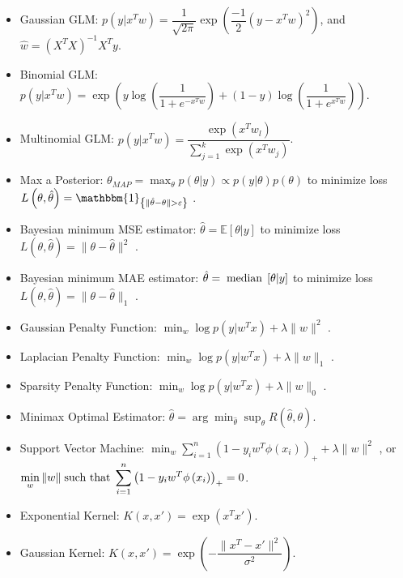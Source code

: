 \documentclass{article}
\begin{document}
\begin{itemize}
\item Gaussian GLM: $p\left(y | x^{T} w\right)  = \dfrac{1}{\sqrt{2 \pi}} \exp\left(\dfrac{-1}{2} \left(y - x^{T} w\right)^{2}\right)$, and $\hat{w} = \left(X^{T} X\right)^{-1} X^{T} y. $
\item Binomial GLM: $p\left(y | x^{T} w\right)  = \exp\left(y \log\left(\dfrac{1}{1 + e^{-x^{T} w}}\right) + \left(1 - y\right) \log\left(\dfrac{1}{1 + e^{x^{T} w}}\right)\right)$.
\item Multinomial GLM: $p\left(y | x^{T} w\right)  = \dfrac{\exp\left(x^{T} w_{l}\right)}{\displaystyle\sum_{j=1}^{k} \exp\left(x^{T} w_{j}\right)}$.
\item Max a Posterior: $\theta_{MAP} = \displaystyle\max_{\theta} p\left(\theta | y\right) \propto p\left(y | \theta\right) p\left(\theta\right)$ to minimize loss $L\left(\theta, \hat{\theta}\right)  = \mathbbm{1}_{\left\{\| \hat{\theta} - \theta \| > \varepsilon\right\}}$ .
\item Bayesian minimum MSE estimator: $\hat{\theta} = \mathbb{E}\left[\theta | y \right]$ to minimize loss $L\left(\theta, \hat{\theta}\right)  = \| \theta - \hat{\theta} \|^{2}$ .
\item Bayesian minimum MAE estimator: $\hat{\theta} = \text{\;median\;} \left[\theta | y \right]$ to minimize loss $L\left(\theta, \hat{\theta}\right)  = \| \theta - \hat{\theta} \|_{1}$ .
\item Gaussian Penalty Function: $\displaystyle\min_{w} \log p\left(y | w^{T} x\right) + \lambda \| w \|^{2}$ .
\item Laplacian Penalty Function: $\displaystyle\min_{w} \log p\left(y | w^{T} x\right) + \lambda \| w \|_{1}$ .
\item Sparsity Penalty Function: $\displaystyle\min_{w} \log p\left(y | w^{T} x\right) + \lambda \| w \|_{0}$ .
\item Minimax Optimal Estimator: $\hat{\theta} = \arg\displaystyle\min_{\hat{\theta}} \displaystyle\sup_{\theta} R\left(\hat{\theta}, \theta\right)$.
\item Support Vector Machine: $\displaystyle\min_{w} \displaystyle\sum_{i=1}^{n} \left(1 - y_{i} w^{T} \phi\left(x_{i}\right)\right)_{+} + \lambda \| w \|^{2}$ , or $\displaystyle\min_{w} \| w \| \text{\;such that\;} \displaystyle\sum_{i=1}^{n} \left(1 - y_{i} w^{T} \phi\left(x_{i}\right)\right)_{+} = 0$.
\item Exponential Kernel: $K\left(x, x'\right)  = \exp\left(x^{T} x'\right)$.
\item Gaussian Kernel: $K\left(x, x'\right)  = \exp\left(- \dfrac{\| x^{T} - x' \|^{2}}{\sigma^{2}}\right)$.

\end{itemize}
\end{document}
